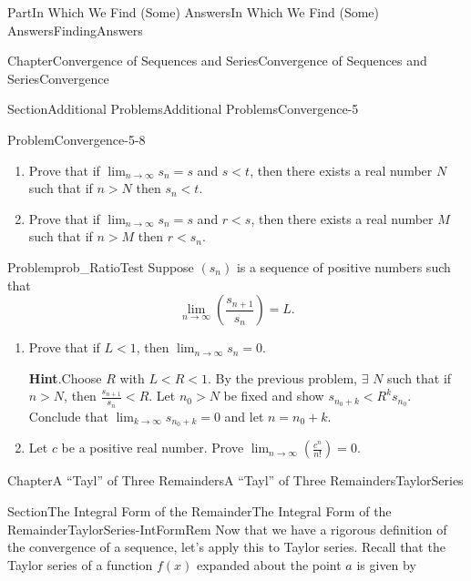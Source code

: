 \documentclass[oneside,10pt,]{book}
\newcommand{\blocktitlefont}{\relax}
\numberwithin{equation}{part}
\def\limit#1#2#3{{\displaystyle\lim_{#1\rightarrow #2}#3}}
\newcommand{\lt}{<}
\begin{document}
\begin{partptx}{Part}{In Which We Find (Some) Answers}{}{In Which We Find (Some) Answers}{}{}{FindingAnswers}
\begin{chapterptx}{Chapter}{Convergence of Sequences and Series}{}{Convergence of Sequences and Series}{}{}{Convergence}
\begin{sectionptx}{Section}{Additional Problems}{}{Additional Problems}{}{}{Convergence-5}
\begin{problem}{Problem}{}{Convergence-5-8}
\begin{enumerate}[font=\bfseries,label=(\alph*),ref=\alph*]
\item{}Prove that if \(\limit{n}{\infty}{s_n}=s\) and \(s\lt
t\), then there exists a real number \(N\) such that if \(n>N\) then \(s_n\lt t\).%
\item{}Prove that if \(\limit{n}{\infty}{s_n}=s\) and \(r\lt
s\), then there exists a real number \(M\) such that if \(n>M\) then \(r\lt s_n\).%
\end{enumerate}%
\end{problem}
\begin{problem}{Problem}{}{prob_RatioTest}%
Suppose \(\left(s_n\right)\) is a sequence of positive numbers such that%
\begin{equation*}
\limit{n}{\infty}{\left(\frac{s_{n+1}}{s_n}\right)}=L\text{.}
\end{equation*}
%
\begin{enumerate}[font=\bfseries,label=(\alph*),ref=\alph*]%
\item{}Prove that if \(L\lt 1\), then \(\limit{n}{\infty}{s_n}=0\).%
\par\smallskip%
\noindent\textbf{\blocktitlefont Hint}.\hypertarget{prob_RatioTest-3-2}{}\quad{}Choose \(R\) with \(L\lt R\lt 1\).  By the previous problem, \(\exists\) \(N\) such that if \(n>N\), then \(\frac{s_{n+1}}{s_n}\lt R\).  Let \(n_0>N\) be fixed and show \(s_{n_0+k}\lt R^ks_{n_0}\). Conclude that \(\lim_{k\rightarrow\infty}s_{n_0+k}=0\) and let \(n=n_0+k\).%
\item{}Let \(c\) be a positive real number.  Prove \(\displaystyle\lim_{n\rightarrow\infty}\left(\frac{c^n}{n!}\right)=0\).%
\end{enumerate}%
\end{problem}
\end{sectionptx}
\end{chapterptx}
%
%
\typeout{************************************************}
\typeout{************************************************}
%
\begin{chapterptx}{Chapter}{A ``Tayl'' of Three Remainders}{}{A ``Tayl'' of Three Remainders}{}{}{TaylorSeries}
\renewcommand*{\chaptername}{Chapter}
%
%
\typeout{************************************************}
\typeout{************************************************}
%
\begin{sectionptx}{Section}{The Integral Form of the Remainder}{}{The Integral Form of the Remainder}{}{}{TaylorSeries-IntFormRem}
Now that we have a rigorous definition of the convergence of a sequence, let's apply this to Taylor series.  Recall that the Taylor series of a function \(f(x)\) expanded about the point \(a\) is given by%

\end{sectionptx}
\end{chapterptx}
\end{partptx}
\end{document}
